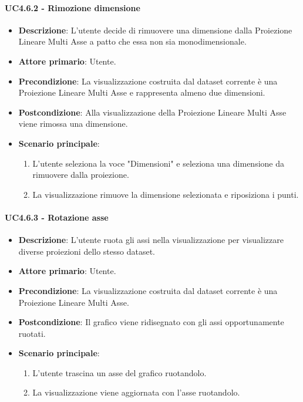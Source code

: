 \paragraph{UC4.6.2 - Rimozione dimensione}
\label{par:uc4.6.2}
\begin{itemize}
    \item \textbf{Descrizione}: L’utente decide di rimuovere una dimensione dalla Proiezione Lineare Multi Asse
                                a patto che essa non sia monodimensionale.

    \item \textbf{Attore primario}: Utente.

    \item \textbf{Precondizione}:   La visualizzazione costruita dal dataset corrente è una Proiezione Lineare Multi Asse
                                    e rappresenta almeno due dimensioni.
    \item \textbf{Postcondizione}:  Alla visualizzazione della Proiezione Lineare Multi Asse viene rimossa una dimensione.

	\item \textbf{Scenario principale}:
        \begin{enumerate}
            \item L'utente seleziona la voce "Dimensioni" e seleziona una dimensione da rimuovere dalla proiezione.
            \item La visualizzazione rimuove la dimensione selezionata e riposiziona i punti.

        \end{enumerate}
\end{itemize}

\paragraph{UC4.6.3 - Rotazione asse}
\label{par:uc4.6.3}
\begin{itemize}
    \item \textbf{Descrizione}: L'utente ruota gli assi nella visualizzazione per visualizzare diverse proiezioni dello stesso dataset.
    \item \textbf{Attore primario}: Utente.
    \item \textbf{Precondizione}: La visualizzazione costruita dal dataset corrente è una Proiezione Lineare Multi Asse.
    \item \textbf{Postcondizione}: Il grafico viene ridisegnato con gli assi opportunamente ruotati.
    \item \textbf{Scenario principale}:
    \begin{enumerate}
        \item L'utente trascina un asse del grafico ruotandolo.
	\item La visualizzazione viene aggiornata con l'asse ruotandolo.
    \end{enumerate}
\end{itemize}


